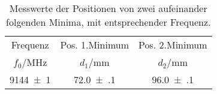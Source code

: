 \begin{table}[!h]
	\centering
	\begin{tabular}{ccc}
		\toprule
		Frequenz & Pos. 1.Minimum & Pos. 2.Minimum\\
		$f_0$/\si{MHz} & $d_1$/\si{mm} & $d_2$/\si{mm}\\
\midrule
		\num{9144(1)} & \num{72.0(1)} & \num{96.0(1)}\\
		\bottomrule
	\end{tabular}
	\caption{Messwerte der Positionen von zwei aufeinander folgenden Minima, mit entsprechender Frequenz. 
                 \label{tab:Elektrische Abstimmung}}
\end{table}
